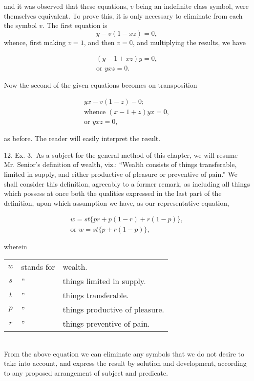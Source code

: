 \documentclass[oneside]{book}
\begin{document}
and it was observed that these equations, $v$ being an indefinite
class symbol, were themselves equivalent. To prove this, it is
only necessary to eliminate from each the symbol $v$. The first
equation is
\[
y - v (1 - xz) = 0,
\]
whence, first making $v = 1$, and then $v = 0$, and multiplying the
results, we have

\begin{eqnarray*}
(y - 1 + xz) y = 0,\\
\textrm{or } yxz = 0.
\end{eqnarray*}

Now the second of the given equations becomes on transposition

\begin{eqnarray*}
yx - v(1 - z) - 0; \\
\textrm{whence } (x - 1 + z) yx = 0,\\
\textrm{or } yxz = 0,
\end{eqnarray*}

as before. The reader will easily interpret the result.

12. Ex. 3.--As a subject for the general method of this
chapter, we will resume Mr. Senior's definition of wealth, viz.:
``Wealth consists of things transferable, limited in supply, and
either productive of pleasure or preventive of pain.'' We shall
consider this definition, agreeably to a former remark, as including
all things which possess at once both the qualities expressed in
the last part of the definition, upon which assumption we have,
as our representative equation,

\begin{eqnarray*}
w = st \{pr + p (1 - r) + r(1 - p)\}, \\
\textrm{or } w = st \{p + r(1 -p)\},
\end{eqnarray*}

wherein

\begin{tabular}{c l l}
$w$&stands for &wealth.\\
$s$&''&things limited in supply.\\
$t$&''&things transferable.\\
$p$&''&things productive of pleasure.\\
$r$&''&things preventive of pain.\\
\end{tabular}\\

From the above equation we can eliminate any symbols that
we do not desire to take into account, and express the result by
solution and development, according to any proposed arrangement
of subject and predicate.
\end{document}
